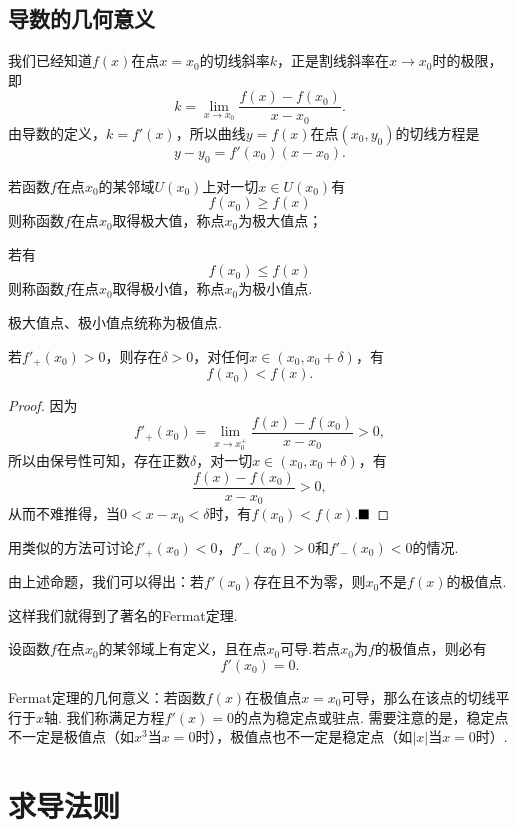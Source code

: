 \subsection{导数的几何意义}
我们已经知道$f(x)$在点$x=x_0$的切线斜率$k$，正是割线斜率在$x\to x_0$时的极限，即
$$k=\lim\limits_{x\to x_0}\frac{f(x)-f(x_0)}{x-x_0}.$$
由导数的定义，$k=f'(x)$，所以曲线$y=f(x)$在点$(x_0,y_0)$的切线方程是
$$y-y_0=f'(x_0)(x-x_0).$$
\begin{definition}[极值点]
	若函数$f$在点$x_0$的某邻域$U(x_0)$上对一切$x\in U(x_0)$有
	$$f(x_0)\geqslant f(x)$$
	则称函数$f$在点$x_0$取得{\heiti 极大值}，称点$x_0$为{\heiti 极大值点}；
	
	若有
	$$f(x_0)\leqslant f(x)$$
	则称函数$f$在点$x_0$取得{\heiti 极小值}，称点$x_0$为{\heiti 极小值点}.
	
	极大值点、极小值点统称为{\heiti 极值点}.
\end{definition}
\begin{proposition}{\label{prooffermat}}
	若$f'_+(x_0)>0$，则存在$\delta>0$，对任何$x\in(x_0,x_0+\delta)$，有
	$$f(x_0)<f(x).$$
\end{proposition}
\begin{proof}
	因为
	$$f'_+(x_0)=\lim\limits_{x\to x_0^+}\frac{f(x)-f(x_0)}{x-x_0}>0,$$
	所以由保号性可知，存在正数$\delta$，对一切$x\in(x_0,x_0+\delta)$，有
	$$\frac{f(x)-f(x_0)}{x-x_0}>0,$$
	从而不难推得，当$0<x-x_0<\delta$时，有$f(x_0)<f(x).$$\hfill\blacksquare$
\end{proof}
\begin{remark}
	用类似的方法可讨论$f'_+(x_0)<0$，$f'_-(x_0)>0$和$f'_-(x_0)<0$的情况.
\end{remark}
\begin{remark}
	由上述命题，我们可以得出：若$f'(x_0)$存在且不为零，则$x_0$不是$f(x)$的极值点.
\end{remark}
这样我们就得到了著名的Fermat定理.
\begin{theorem}[Fermat定理]
	设函数$f$在点$x_0$的某邻域上有定义，且在点$x_0$可导.若点$x_0$为$f$的极值点，则必有
	$$f'(x_0)=0.$$
\end{theorem}
Fermat定理的几何意义：若函数$f(x)$在极值点$x=x_0$可导，那么在该点的切线平行于$x$轴.
我们称满足方程$f'(x)=0$的点为{\heiti 稳定点}或{\heiti 驻点}.
需要注意的是，稳定点不一定是极值点（如$x^3$当$x=0$时），极值点也不一定是稳定点（如$|x|$当$x=0$时）.
\section{求导法则}
